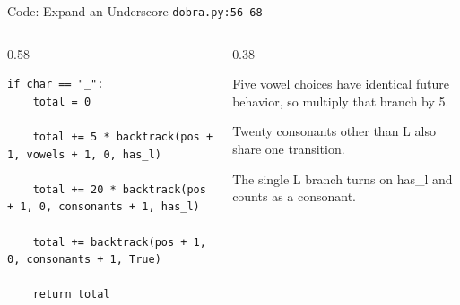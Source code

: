 \documentclass[aspectratio=169,11pt]{beamer}
\begin{document}
\begin{frame}[fragile]{Code: Expand an Underscore}
\scriptsize
{} \texttt{dobra.py:56--68}

\vspace{0.08cm}
\begin{columns}[T,totalwidth=\textwidth]
\begin{column}{0.58\textwidth}
\begin{lstlisting}[style=cpcode]
if char == "_":
    total = 0

    total += 5 * backtrack(pos + 1, vowels + 1, 0, has_l)

    total += 20 * backtrack(pos + 1, 0, consonants + 1, has_l)

    total += backtrack(pos + 1, 0, consonants + 1, True)

    return total
\end{lstlisting}
\end{column}
\begin{column}{0.38\textwidth}
\begin{tightitemize}
  \item Five vowel choices have identical future behavior, so multiply that branch by 5.
  \item Twenty consonants other than L also share one transition.
  \item The single L branch turns on has\_l and counts as a consonant.
\end{tightitemize}
\end{column}
\end{columns}
\end{frame}
\end{document}
